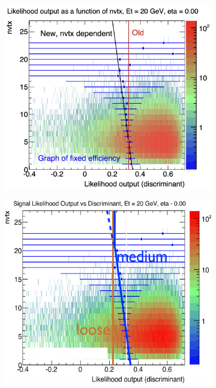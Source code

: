 \begin{figure}[h]
\centering
    \begin{subfigure}[b]{0.49\textwidth}
      \centering
      \includegraphics[width=1.0\textwidth]{figs/egamma/equiEfficiency.png}
      \caption{}
      \label{fig:egamma:equiEfficiency}
    \end{subfigure}
    \hfill
    \begin{subfigure}[b]{0.49\textwidth}
      \centering
      \includegraphics[width=1.0\textwidth]{figs/egamma/nvtx.png}

\end{subfigure}
\end{figure}

